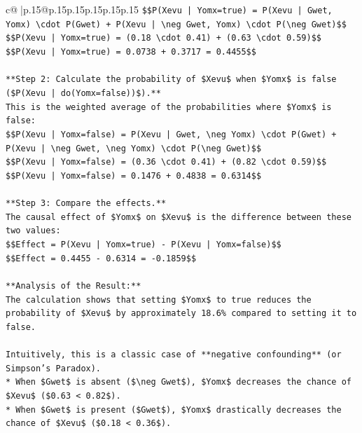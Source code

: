 \documentclass{article}
\begin{document}
{\begin{supertabular}{c@{$\;$}|p{.15\linewidth}@{}p{.15\linewidth}p{.15\linewidth}p{.15\linewidth}p{.15\linewidth}p{.15\linewidth}}
{{{\texttt{\$\$P(Xevu | Yomx=true) = P(Xevu | Gwet, Yomx) \textbackslash{}cdot P(Gwet) + P(Xevu | \textbackslash{}neg Gwet, Yomx) \textbackslash{}cdot P(\textbackslash{}neg Gwet)\$\$} \\
\texttt{\$\$P(Xevu | Yomx=true) = (0.18 \textbackslash{}cdot 0.41) + (0.63 \textbackslash{}cdot 0.59)\$\$} \\
\texttt{\$\$P(Xevu | Yomx=true) = 0.0738 + 0.3717 = 0.4455\$\$} \\
\\ 
\texttt{**Step 2: Calculate the probability of \$Xevu\$ when \$Yomx\$ is false (\$P(Xevu | do(Yomx=false))\$).**} \\
\texttt{This is the weighted average of the probabilities where \$Yomx\$ is false:} \\
\texttt{\$\$P(Xevu | Yomx=false) = P(Xevu | Gwet, \textbackslash{}neg Yomx) \textbackslash{}cdot P(Gwet) + P(Xevu | \textbackslash{}neg Gwet, \textbackslash{}neg Yomx) \textbackslash{}cdot P(\textbackslash{}neg Gwet)\$\$} \\
\texttt{\$\$P(Xevu | Yomx=false) = (0.36 \textbackslash{}cdot 0.41) + (0.82 \textbackslash{}cdot 0.59)\$\$} \\
\texttt{\$\$P(Xevu | Yomx=false) = 0.1476 + 0.4838 = 0.6314\$\$} \\
\\ 
\texttt{**Step 3: Compare the effects.**} \\
\texttt{The causal effect of \$Yomx\$ on \$Xevu\$ is the difference between these two values:} \\
\texttt{\$\$Effect = P(Xevu | Yomx=true) {-} P(Xevu | Yomx=false)\$\$} \\
\texttt{\$\$Effect = 0.4455 {-} 0.6314 = {-}0.1859\$\$} \\
\\ 
\texttt{**Analysis of the Result:**} \\
\texttt{The calculation shows that setting \$Yomx\$ to true reduces the probability of \$Xevu\$ by approximately 18.6\% compared to setting it to false.} \\
\\ 
\texttt{Intuitively, this is a classic case of **negative confounding** (or Simpson's Paradox).} \\
\texttt{*   When \$Gwet\$ is absent (\$\textbackslash{}neg Gwet\$), \$Yomx\$ decreases the chance of \$Xevu\$ (\$0.63 < 0.82\$).} \\
\texttt{*   When \$Gwet\$ is present (\$Gwet\$), \$Yomx\$ drastically decreases the chance of \$Xevu\$ (\$0.18 < 0.36\$).} \\
}}}
\end{supertabular}}
\end{document}
